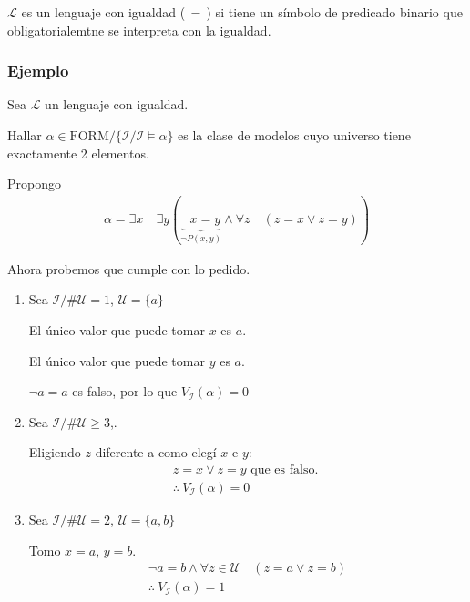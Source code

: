 \begin{definicion}{}{}
    $\mathcal{L}$ es un lenguaje con igualdad ($\,=\,$) si tiene un símbolo
    de predicado binario que obligatorialemtne se interpreta con la igualdad.
\end{definicion}

\subsubsection{Ejemplo}

Sea $\mathcal{L}$ un lenguaje con igualdad.

Hallar $\alpha \in \mathrm{FORM} / \{ \mathcal{I} / \mathcal{I} \vDash \alpha \}$
es la clase de modelos cuyo universo tiene exactamente 2 elementos.

Propongo
\begin{gather*}
    \alpha = \exists x \quad \exists y ( \underbrace{\neg x = y}_{\neg P(x,y)}
    \wedge \forall z \quad (z = x \vee z = y)) 
\end{gather*}

Ahora probemos que cumple con lo pedido.
\begin{enumerate}
    \item Sea $\mathcal{I} / \# \mathcal{U} = 1$, $\mathcal{U} = \{ a \}$

        El único valor que puede tomar $x$ es $a$.

        El único valor que puede tomar $y$ es $a$.
        \begin{center}
            $\neg a = a$ es falso, por lo que $V_{\mathcal{I}}(\alpha) = 0$
        \end{center}

    \item Sea $\mathcal{I} / \# \mathcal{U} \geq 3$,.

        Eligiendo $z$ diferente a como elegí $x$ e $y$:
        \begin{gather*}
            z = x \vee z = y \text{ que es falso. }\\ 
            \therefore ~ V_{\mathcal{I}} (\alpha) = 0
        \end{gather*}

    \item Sea $\mathcal{I}/ \# \mathcal{U} = 2$, $\mathcal{U} = \{ a,b \}$

        Tomo $x = a$, $y = b$.
        \begin{gather*}
            \neg a = b \wedge \forall z \in \mathcal{U} \quad (z=a \vee z=b) \\
            \therefore ~ V_{\mathcal{I}} (\alpha) =  1
        \end{gather*}
\end{enumerate}


